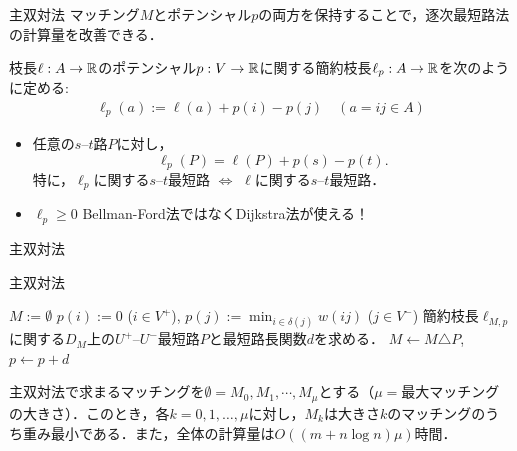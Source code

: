 \documentclass[14pt,aspectratio=169,xcolor=dvipsnames,table,onlytextwidth,dvipdfmx]{beamer}
\begin{document}
\begin{frame}{主双対法}
    \small
    マッチング$M$とポテンシャル$p$の両方を保持することで，逐次最短路法の計算量を改善できる．

    \begin{definition}[簡約枝長]
        枝長$\ell: A \to \mathbb{R}$のポテンシャル$p: V \to \mathbb{R}$に関する\alert{簡約枝長}$\ell_p: A \to \mathbb{R}$を次のように定める:
        \begin{align*}
       \ell_p(a) := \ell(a) + p(i) - p(j) \quad (a = ij \in A) 
        \end{align*}
    \end{definition}

    \bigskip
    \begin{itemize}
        \item 
    任意の$s$--$t$路$P$に対し，
    \[
        \ell_p(P) = \ell(P) + p(s) - p(t).
    \]
    特に，$\ell_p$に関する$s$--$t$最短路 $\iff$ $\ell$に関する$s$--$t$最短路．
        \item $\ell_p \geq 0$ \dotfill\alert{Bellman-Ford法ではなくDijkstra法が使える！}
    \end{itemize}
\end{frame}

\begin{frame}{主双対法}
    
    \small
    \begin{block}{主双対法}
        \begin{algorithmic}[1]
            \STATE $M := \emptyset$ 
            \STATE $p(i) := 0$ ($i \in V^+$), $p(j) := \min_{i \in \delta(j)} w(ij)$ ($j \in V^-$) 
                \STATE 簡約枝長$\ell_{M,p}$に関する$D_M$上の$U^+$--$U^-$最短路$P$と最短路長関数$d$を求める． 
                \STATE $M \gets M \triangle P$, $p \gets p + d$ 
            \ENDWHILE
        \end{algorithmic} 
    \end{block}

    \vfill
    \begin{theorem}
        主双対法で求まるマッチングを$\emptyset = M_0, M_1, \cdots,M_{\mu}$とする（$\mu =$最大マッチングの大きさ）．このとき，各$k=0, 1, \dots, \mu$に対し，$M_k$は大きさ$k$のマッチングのうち重み最小である．また，全体の計算量は$O((m + n \log n)\mu)$時間．
    \end{theorem}
\end{frame}
\end{document}
